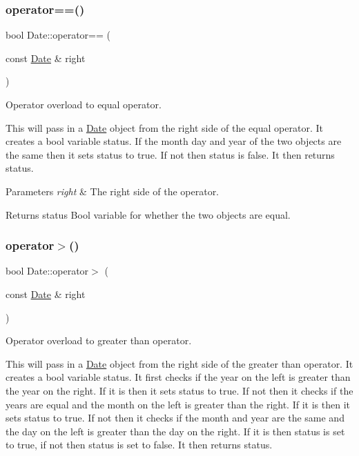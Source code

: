 \subsubsection{\texorpdfstring{operator==()}{operator==()}}
{\footnotesize\ttfamily bool Date\+::operator== (\begin{DoxyParamCaption}\item[{const \mbox{\hyperlink{class_date}{Date}} \&}]{right }\end{DoxyParamCaption})\hspace{0.3cm}{\ttfamily [inline]}}



Operator overload to equal operator. 

This will pass in a \mbox{\hyperlink{class_date}{Date}} object from the right side of the equal operator. It creates a bool variable {\ttfamily status}. If the month day and year of the two objects are the same then it sets {\ttfamily status} to true. If not then {\ttfamily status} is false. It then returns {\ttfamily status}.


\begin{DoxyParams}{Parameters}
{\em right} & The right side of the operator.\\
\hline
\end{DoxyParams}
\begin{DoxyReturn}{Returns}
status Bool variable for whether the two objects are equal. 
\end{DoxyReturn}
\mbox{\label{class_date_ac90afc16b9a3b887c960861643fc0ba1}} 
\subsubsection{\texorpdfstring{operator$>$()}{operator>()}}
{\footnotesize\ttfamily bool Date\+::operator$>$ (\begin{DoxyParamCaption}\item[{const \mbox{\hyperlink{class_date}{Date}} \&}]{right }\end{DoxyParamCaption})\hspace{0.3cm}{\ttfamily [inline]}}



Operator overload to greater than operator. 

This will pass in a \mbox{\hyperlink{class_date}{Date}} object from the right side of the greater than operator. It creates a bool variable {\ttfamily status}. It first checks if the year on the left is greater than the year on the right. If it is then it sets {\ttfamily status} to true. If not then it checks if the years are equal and the month on the left is greater than the right. If it is then it sets {\ttfamily status} to true. If not then it checks if the month and year are the same and the day on the left is greater than the day on the right. If it is then {\ttfamily status} is set to true, if not then {\ttfamily status} is set to false. It then returns {\ttfamily status}.


